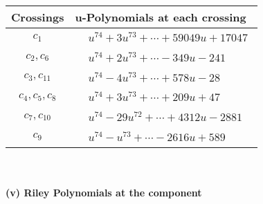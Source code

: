 \documentclass[1p]{elsarticle_modified}
\theoremstyle{definition}
\begin{document}
\begin{tabular}{m{50pt}|m{274pt}}
Crossings & \hspace{64pt}u-Polynomials at each crossing \\
\hline $$\begin{aligned}c_{1}\end{aligned}$$&$\begin{aligned}
&u^{74}+3 u^{73}+\cdots+59049 u+17047
\end{aligned}$\\
\hline $$\begin{aligned}c_{2},c_{6}\end{aligned}$$&$\begin{aligned}
&u^{74}+2 u^{73}+\cdots-349 u-241
\end{aligned}$\\
\hline $$\begin{aligned}c_{3},c_{11}\end{aligned}$$&$\begin{aligned}
&u^{74}-4 u^{73}+\cdots+578 u-28
\end{aligned}$\\
\hline $$\begin{aligned}c_{4},c_{5},c_{8}\end{aligned}$$&$\begin{aligned}
&u^{74}+3 u^{73}+\cdots+209 u+47
\end{aligned}$\\
\hline $$\begin{aligned}c_{7},c_{10}\end{aligned}$$&$\begin{aligned}
&u^{74}-29 u^{72}+\cdots+4312 u-2881
\end{aligned}$\\
\hline $$\begin{aligned}c_{9}\end{aligned}$$&$\begin{aligned}
&u^{74}- u^{73}+\cdots-2616 u+589
\end{aligned}$\\
\hline
\end{tabular}\\~\\
\newpage\renewcommand{\arraystretch}{1}
\flushleft \textbf{(v) Riley Polynomials at the component}\newline \\
\end{document}

